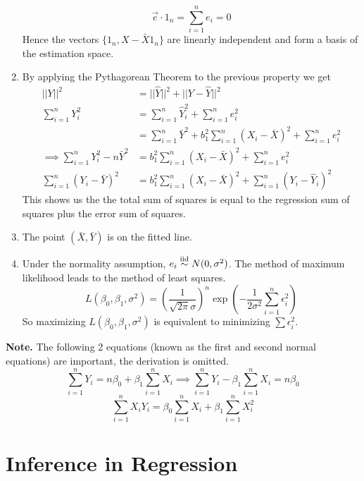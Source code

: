 \begin{enumerate}[label=(\roman*)]
    \[\vec{e} \cdot 1_n = \sum_{i=1}^n e_i = 0\]
    Hence the vectors $\{1_n, X - \bar{X}1_n\}$ are linearly independent and form a basis of the estimation space. 
    \item By applying the Pythagorean Theorem to the previous property we get 
    \begin{align*}
        ||Y||^2 &= ||\hat{Y}||^2 + ||Y-\hat{Y}||^2\\
        \sum_{i=1}^n Y_i^2 &= \sum_{i=1}^n \hat{Y}_i^2 + \sum_{i=1}^n e_i^2\\
        &= \sum_{i=1}^n \bar{Y}^2 + b_1^2\sum_{i=1}^n (X_i - \bar{X})^2 + \sum_{i=1}^n e_i^2\\
        \implies \sum_{i=1}^n Y_i^2 - n\bar{Y}^2 &= b_1^2\sum_{i=1}^n (X_i -\bar{X})^2 + \sum_{i=1}^n e_i^2\\
        \sum_{i=1}^n (Y_i - \bar{Y})^2 &= b_1^2\sum_{i=1}^n (X_i - \bar{X})^2 + \sum_{i=1}^n \left(Y_i - \hat{Y}_i\right)^2     
    \end{align*}
    This shows us the the total sum of squares is equal to the regression sum of squares plus the error sum of squares. 
    \item The point $(\bar{X}, \bar{Y})$ is on the fitted line. 
    \item Under the normality assumption, $e_i \overset{\mathrm{iid}}{\sim} N(0,\sigma^2)$. The method of maximum likelihood leads to the method of least squares.
    \[L(\beta_0, \beta_1,\sigma^2) = \left(\frac{1}{\sqrt{2\pi}\sigma}\right)^n\exp\left(-\frac{1}{2\sigma^2}\sum_{i=1}^n \epsilon_i^2\right)\]
    So maximizing $L(\beta_0,\beta_1, \sigma^2)$ is equivalent to minimizing $\sum \epsilon_i^2$.
\end{enumerate}

\textbf{Note.} The following 2 equations (known as the first and second normal equations) are important, the derivation is omitted.
\[\sum_{i=1}^n Y_i = n\beta_0 + \beta_1 \sum_{i=1}^nX_i \implies \sum_{i=1}^n Y_i - \beta_1 \sum_{i=1}^n X_i = n\beta_0\]
\[\sum_{i=1}^n X_iY_i = \beta_0 \sum_{i=1}^n X_i + \beta_1\sum_{i=1}^n X_i^2\]


\section{Inference in Regression}

